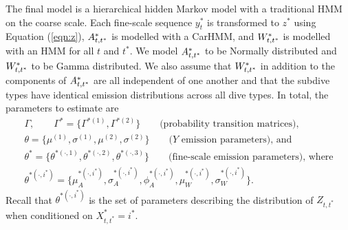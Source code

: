 The final model is a hierarchical hidden Markov model with a traditional HMM on the coarse scale. Each fine-scale sequence $y^*_t$ is transformed to $z^*$ using Equation (\ref{eqn:z}), $A^*_{t,t^*}$ is modelled with a CarHMM, and $W^*_{t,t^*}$ is modelled with an HMM for all $t$ and $t^*$. We model $A^*_{t,t^*}$ to be Normally distributed and $W^*_{t,t^*}$ to be Gamma distributed. We also assume that $W^*_{t,t^*}$ in addition to the components of $A^*_{t,t^*}$ are all independent of one another and that the subdive types have identical emission distributions across all dive types. In total, the parameters to estimate are
%
\begin{gather*}
    \Gamma, \qquad \Gamma^{*} = \{\Gamma^{*(1)},\Gamma^{*(2)}\} \qquad \text{(probability transition matrices)}, \\
    \theta = \{\mu^{(1)},\sigma^{(1)},\mu^{(2)},\sigma^{(2)}\} \qquad \text{($Y$ emission parameters), and} \\
    \theta^* = \{\theta^{*(\cdot,1)},\theta^{*(\cdot,2)},\theta^{*(\cdot,3)}\}  \qquad \text{(fine-scale emission parameters), where} \\
    \theta^{*(\cdot,i^*)} =  \{\mu_A^{*(\cdot,i^*)},\sigma_A^{*(\cdot,i^*)},\phi_A^{*(\cdot,i^*)},\mu_W^{*(\cdot,i^*)},\sigma_W^{*(\cdot,i^*)}\}.
\end{gather*}
%
Recall that $\theta^{*(\cdot,i^*)}$ is the set of parameters describing the distribution of $Z_{t,t^*}$ when conditioned on $X^*_{t,t^*} = i^*$. 

